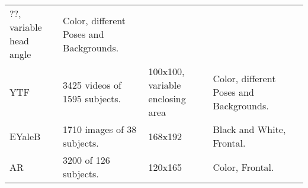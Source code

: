 \documentclass[]{article}
\begin{document}
\begin{longtable}[]{@{}lllll@{}}
\begin{minipage}[t]{0.14\columnwidth}
??, variable head angle\strut
\end{minipage} & \begin{minipage}[t]{0.19\columnwidth}\raggedright
Color, different Poses and Backgrounds.\strut
\end{minipage} & \begin{minipage}[t]{0.20\columnwidth}\raggedright
\autocite{huang2008}\strut
\end{minipage}\tabularnewline
\begin{minipage}[t]{0.09\columnwidth}\raggedright
YTF\strut
\end{minipage} & \begin{minipage}[t]{0.24\columnwidth}\raggedright
3425 videos of 1595 subjects.\strut
\end{minipage} & \begin{minipage}[t]{0.14\columnwidth}\raggedright
100x100, variable enclosing area\strut
\end{minipage} & \begin{minipage}[t]{0.19\columnwidth}\raggedright
Color, different Poses and Backgrounds.\strut
\end{minipage} & \begin{minipage}[t]{0.20\columnwidth}\raggedright
\autocite{wolf2011}\strut
\end{minipage}\tabularnewline
\begin{minipage}[t]{0.09\columnwidth}\raggedright
EYaleB\strut
\end{minipage} & \begin{minipage}[t]{0.24\columnwidth}\raggedright
1710 images of 38 subjects.\strut
\end{minipage} & \begin{minipage}[t]{0.14\columnwidth}\raggedright
168x192\strut
\end{minipage} & \begin{minipage}[t]{0.19\columnwidth}\raggedright
Black and White, Frontal.\strut
\end{minipage} & \begin{minipage}[t]{0.20\columnwidth}\raggedright
\autocite{sanchez2006}\strut
\end{minipage}\tabularnewline
\begin{minipage}[t]{0.09\columnwidth}\raggedright
AR\strut
\end{minipage} & \begin{minipage}[t]{0.24\columnwidth}\raggedright
3200 of 126 subjects.\strut
\end{minipage} & \begin{minipage}[t]{0.14\columnwidth}\raggedright
120x165\strut
\end{minipage} & \begin{minipage}[t]{0.19\columnwidth}\raggedright
Color, Frontal.\strut
\end{minipage} & \begin{minipage}[t]{0.20\columnwidth}\raggedright
\autocite{mart1998}\strut
\end{minipage}\tabularnewline
\bottomrule
\end{longtable}
\end{document}
